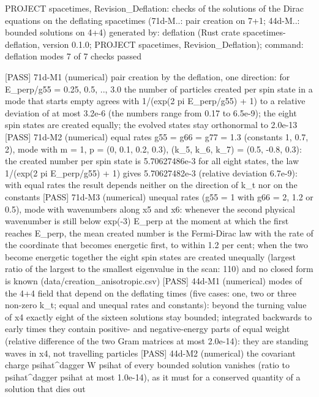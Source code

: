 \documentclass[
  10pt,
]{article}
\newenvironment{Shaded}{}{}
\newcommand{\NormalTok}[1]{#1}
\begin{document}
\begin{Shaded}
\begin{Highlighting}[]
\NormalTok{PROJECT spacetimes, Revision\_Deflation: checks of the solutions of the Dirac equations on the deflating spacetimes (71d{-}M..: pair creation on 7+1; 44d{-}M..: bounded solutions on 4+4)}
\NormalTok{generated by: deflation (Rust crate spacetimes{-}deflation, version 0.1.0; PROJECT spacetimes, Revision\_Deflation); command: deflation modes}
\NormalTok{7 of 7 checks passed}

\NormalTok{[PASS] 71d{-}M1  (numerical) pair creation by the deflation, one direction: for E\_perp/g55 = 0.25, 0.5, .., 3.0 the number of particles created per spin state in a mode that starts empty agrees with 1/(exp(2 pi E\_perp/g55) + 1) to a relative deviation of at most 3.2e{-}6 (the numbers range from 0.17 to 6.5e{-}9); the eight spin states are created equally; the evolved states stay orthonormal to 2.0e{-}13}
\NormalTok{[PASS] 71d{-}M2  (numerical) equal rates g55 = g66 = g77 = 1.3 (constants 1, 0.7, 2), mode with m = 1, p = (0, 0.1, 0.2, 0.3), (k\_5, k\_6, k\_7) = (0.5, {-}0.8, 0.3): the created number per spin state is 5.70627486e{-}3 for all eight states, the law 1/(exp(2 pi E\_perp/g55) + 1) gives 5.70627482e{-}3 (relative deviation 6.7e{-}9): with equal rates the result depends neither on the direction of k\_t nor on the constants}
\NormalTok{[PASS] 71d{-}M3  (numerical) unequal rates (g55 = 1 with g66 = 2, 1.2 or 0.5), mode with wavenumbers along x5 and x6: whenever the second physical wavenumber is still below exp({-}3) E\_perp at the moment at which the first reaches E\_perp, the mean created number is the Fermi{-}Dirac law with the rate of the coordinate that becomes energetic first, to within 1.2 per cent; when the two become energetic together the eight spin states are created unequally (largest ratio of the largest to the smallest eigenvalue in the scan: 110) and no closed form is known (data/creation\_anisotropic.csv)}
\NormalTok{[PASS] 44d{-}M1  (numerical) modes of the 4+4 field that depend on the deflating times (five cases: one, two or three non{-}zero k\_t; equal and unequal rates and constants): beyond the turning value of x4 exactly eight of the sixteen solutions stay bounded; integrated backwards to early times they contain positive{-} and negative{-}energy parts of equal weight (relative difference of the two Gram matrices at most 2.0e{-}14): they are standing waves in x4, not travelling particles}
\NormalTok{[PASS] 44d{-}M2  (numerical) the covariant charge psihat\^{}dagger W psihat of every bounded solution vanishes (ratio to psihat\^{}dagger psihat at most 1.0e{-}14), as it must for a conserved quantity of a solution that dies out}

\end{Highlighting}
\end{Shaded}
\end{document}
